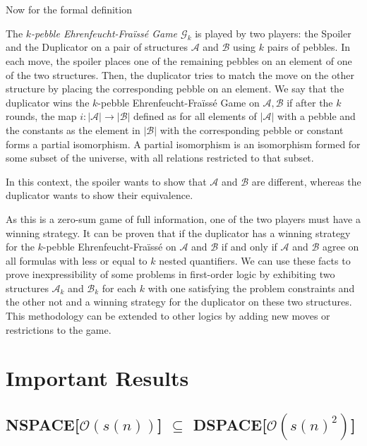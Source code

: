 Now for the formal definition
\begin{define}
    The \emph{$k$-pebble Ehrenfeucht-Fraïssé Game $\mathcal{G}_k$} is played by two players: the Spoiler and the Duplicator on a pair of structures $\mathcal{A}$ and $\mathcal{B}$ using $k$ pairs of pebbles.
    In each move, the spoiler places one of the remaining pebbles on an element of one of the two structures.
    Then, the duplicator tries to match the move on the other structure by placing the corresponding pebble on an element.
    We say that the duplicator wins the $k$-pebble Ehrenfeucht-Fraïssé Game on $\mathcal{A}, \mathcal{B}$ if after the $k$ rounds, the map $i : |\mathcal{A}| \to |\mathcal{B}|$ defined as for all elements of $|\mathcal{A}|$ with a pebble and the constants as the element in $|\mathcal{B}|$ with the corresponding pebble or constant forms a partial isomorphism.
    A partial isomorphism is an isomorphism formed for some subset of the universe, with all relations restricted to that subset.
\end{define}

In this context, the spoiler wants to show that $\mathcal{A}$ and $\mathcal{B}$ are different, whereas the duplicator wants to show their equivalence.

As this is a zero-sum game of full information, one of the two players must have a winning strategy.
It can be proven that if the duplicator has a winning strategy for the $k$-pebble Ehrenfeucht-Fraïssé on $\mathcal{A}$ and $\mathcal{B}$ if and only if $\mathcal{A}$ and $\mathcal{B}$ agree on all formulas with less or equal to $k$ nested quantifiers.
We can use these facts to prove inexpressibility of some problems in first-order logic by exhibiting two structures $\mathcal{A}_k$ and $\mathcal{B}_k$ for each $k$ with one satisfying the problem constraints and the other not and a winning strategy for the duplicator on these two structures.
This methodology can be extended to other logics by adding new moves or restrictions to the game.


\section{Important Results}\label{sec:important-results}

\subsection{NSPACE[$\mathcal{O}(s(n))$] $\subseteq$ DSPACE[$\mathcal{O}(s(n)^2)$]}\label{subsec:nspacesubsetdspacesquared}

